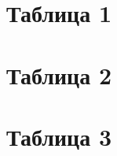 \documentclass[a4paper,11pt]{article}
\begin{document}
	\section{Таблица 1}
	\section{Таблица 2}

	\section{Таблица 3}
\end{document}
